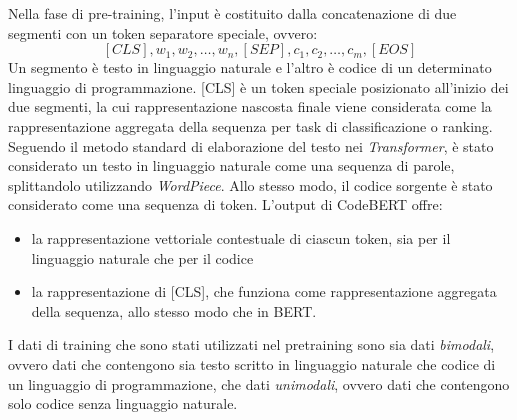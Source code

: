 \documentclass[../../Thesis.tex]{subfiles}
\begin{document}
Nella fase di pre-training, l'input è costituito dalla concatenazione di due segmenti con un token separatore speciale, ovvero: $$[CLS], w_1, w_2, \ldots, w_n, [SEP], c_1, c_2, \ldots, c_m, [EOS]$$
Un segmento è testo in linguaggio naturale e l'altro è codice di un determinato linguaggio di programmazione. [CLS] è un token speciale posizionato all'inizio dei due segmenti, la cui rappresentazione nascosta finale viene considerata come la rappresentazione aggregata della sequenza per task di classificazione o ranking. Seguendo il metodo standard di elaborazione del testo nei \textit{Transformer}, è stato considerato un testo in linguaggio naturale come una sequenza di parole, splittandolo utilizzando  \textit{WordPiece}. Allo stesso modo, il codice sorgente è stato considerato come una sequenza di token.
L'output di CodeBERT offre: 
\begin{itemize}
    \item la rappresentazione vettoriale contestuale di ciascun token, sia per il linguaggio naturale che per il codice
    \item la rappresentazione di [CLS], che funziona come rappresentazione aggregata della sequenza, allo stesso modo che in BERT.
\end{itemize}
I dati di training che sono stati utilizzati nel pretraining sono sia dati \emph{bimodali}, ovvero dati che contengono sia testo scritto in linguaggio naturale che codice di un linguaggio di programmazione, che dati \emph{unimodali}, ovvero dati che contengono solo codice senza linguaggio naturale. 
\end{document}

